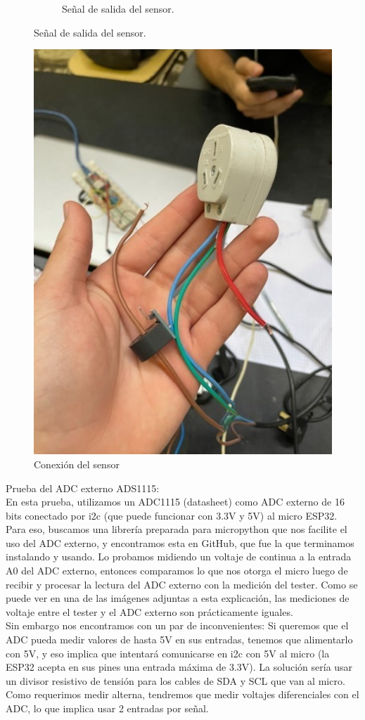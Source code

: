 \begin{figure}[H]
\begin{subfigure}{0.5\textwidth}
\caption{Señal de salida del sensor.}
\end{subfigure}
\end{figure}

\begin{figure}[H]
    \centering
    \includegraphics[width=0.75\linewidth]{informes/Screenshot_10.jpg}
    \caption{Conexión del sensor}
\end{figure}

Prueba del ADC externo ADS1115:\\

En esta prueba, utilizamos un ADC1115 (datasheet) como ADC externo de 16 bits conectado por i2c (que puede funcionar con 3.3V y 5V) al micro ESP32. Para eso, buscamos una librería preparada para micropython que nos facilite el uso del ADC externo, y encontramos esta en GitHub, que fue la que terminamos instalando y usando. Lo probamos midiendo un voltaje de continua a la entrada A0 del ADC externo, entonces comparamos lo que nos otorga el micro luego de recibir y procesar la lectura del ADC externo con la medición del tester. Como se puede ver en una de las imágenes adjuntas a esta explicación, las mediciones de voltaje entre el tester y el ADC externo son prácticamente iguales. \\

Sin embargo nos encontramos con un par de inconvenientes:
Si queremos que el ADC pueda medir valores de hasta 5V en sus entradas, tenemos que alimentarlo con 5V, y eso implica que intentará comunicarse en i2c con 5V al micro (la ESP32 acepta en sus pines una entrada máxima de 3.3V). La solución sería usar un divisor resistivo de tensión para los cables de SDA y SCL que van al micro.
Como requerimos medir alterna, tendremos que medir voltajes diferenciales con el ADC, lo que implica usar 2 entradas por señal.\\

